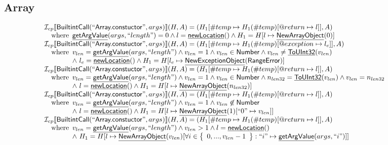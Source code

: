 \documentclass{article}
\makeatletter
\newcommand{\SF}[1]{\mbox{\textsf{#1}}}
\newcommand{\wherec}[1]{{\rm where}\begin{array}[t]{l}#1\end{array}}
\newcommand{\I}{\mathcal{I}}
\newcommand{\set}[1]{\left\{\begin{array}{l}#1\end{array}\right\}}
\newcommand{\lbr}{\llbracket}
\newcommand{\rbr}{\rrbracket}
\newcommand{\hf}[1]{\underline{\sf #1}}
\newcommand{\varloc}[1]{\##1}
\newcommand{\varprop}[1]{@#1}
\makeatother
\begin{document}
\subsection{Array}
\[
\begin{array}{l}
\I _{cp}\lbr \SF{BuiltintCall}(``\SF{Array.constuctor}",args)\rbr(H,A)
 = (H_1[\varloc{temp}\mapsto H_1(\varloc{temp})[\varprop{return}\mapsto l]], A) \\
\quad\wherec{
  \hf{getArgValue}(args, ``length") = 0 \land l = \hf{newLocation}()
  \land H_1 = H[l \mapsto \hf{NewArrayObject}(0)]
  }\\
  
\I _{cp}\lbr \SF{BuiltintCall}(``\SF{Array.constuctor}",args)\rbr(H,A)
 = (H_1[\varloc{temp}\mapsto H_1(\varloc{temp})[\varprop{exception}\mapsto l_e]], A) \\
\quad\wherec{
  v_{len} = \hf{getArgValue}(args, ``length") \land v_{len} = 1 \land v_{len} \in \SF{Number} 
  \land v_{len} \neq \hf{ToUInt32}(v_{len})\\
  \land\ l_e = \hf{newLocation}() \land H_1=H[l_e\mapsto\hf{NewExceptionObject}(\SF{RangeError})] 
  }\\
  
\I _{cp}\lbr \SF{BuiltintCall}(``\SF{Array.constuctor}",args)\rbr(H,A)
 = (H_1[\varloc{temp}\mapsto H_1(\varloc{temp})[\varprop{return}\mapsto l]], A) \\
\quad\wherec{
  v_{len} = \hf{getArgValue}(args, ``length") \land v_{len} = 1 \land v_{len} \in \SF{Number} 
  \land n_{len32} = \hf{ToUInt32}(v_{len}) \land v_{len} = n_{len32}\\
  \land\ l = \hf{newLocation}()  \land H_1 = H[l \mapsto \hf{NewArrayObject}(n_{len32})]
  }\\
  
\I _{cp}\lbr \SF{BuiltintCall}(``\SF{Array.constuctor}",args)\rbr(H,A)
 = (H_1[\varloc{temp}\mapsto H_1(\varloc{temp})[\varprop{return}\mapsto l]], A) \\
\quad\wherec{
  v_{len} = \hf{getArgValue}(args, ``length") \land v_{len} = 1 \land v_{len} \not\in \SF{Number}\\
  \land\ l = \hf{newLocation}()  \land H_1 = H[l \mapsto \hf{NewArrayObject}(1)[``0" \mapsto v_{len}]]
  }\\
  
\I _{cp}\lbr \SF{BuiltintCall}(``\SF{Array.constuctor}",args)\rbr(H,A)
 = (H_1[\varloc{temp}\mapsto H_1(\varloc{temp})[\varprop{return}\mapsto l]], A) \\
\quad\wherec{
  v_{len} = \hf{getArgValue}(args, ``length") \land v_{len} > 1 \land l = \hf{newLocation}()\\
  \land\ H_1 = H[l \mapsto \hf{NewArrayObject}(v_{len})
    [\forall i \in \set{0,..., v_{len} -1}:``i" \mapsto \hf{getArgValue}(args, ``i")]]
  }\\
  

\end{array}\]
\end{document}
